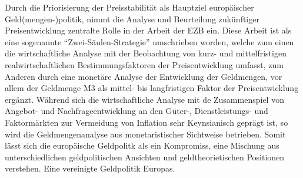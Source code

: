 \documentclass[
  onecolumn,
  a4paper,
  abstracton,
  parskip=half
  ,final
  ]{scrartcl}
\begin{document}
\citep[vgl.][S.558f]{Basseler2010}

Durch die Priorisierung der Preisstabilit{\"a}t als Hauptziel europ{\"a}ischer Geld(mengen-)politik, nimmt die Analyse und Beurteilung zuk{\"u}nftiger Preisentwicklung zentralte Rolle in der Arbeit der EZB ein. Diese Arbeit ist als eine sogenannte "`Zwei-S{\"a}ulen-Strategie"' umschrieben worden\citep[S.568]{Basseler2010}, welche zum einen die wirtschaftliche Analyse mit der Beobachtung von kurz- und mittelfristigen realwirtschaftlichen Bestimmungsfaktoren der Preisentwicklung umfasst,
zum Anderen durch eine monet{\"a}re Analyse der Entwicklung der Geldmengen, vor allem der Geldmenge M3 als mittel- bis langfristigen Faktor der Preisentwicklung erg{\"a}nzt.
W{\"a}hrend sich die wirtschaftliche Analyse mit de Zusammenspiel von Angebot- und Nachfrageentwicklung an den G{\"u}ter-, Dienstleistungs- und Faktorm{\"a}rkten zur Vermeidung von Inflation sehr Keynsianisch gepr{\"a}gt ist, so wird die Geldmengenanalyse aus monetaristischer Sichtweise betrieben\citep[S.568]{Basseler2010}. Somit l{\"a}sst sich die europ{\"a}ische Geldpolitk als ein Kompromiss, eine Mischung aus unterschiedlichen geldpolitischen Ansichten und geldtheorietischen Positionen verstehen. Eine vereinigte Geldpolitik Europas.
\end{document}
